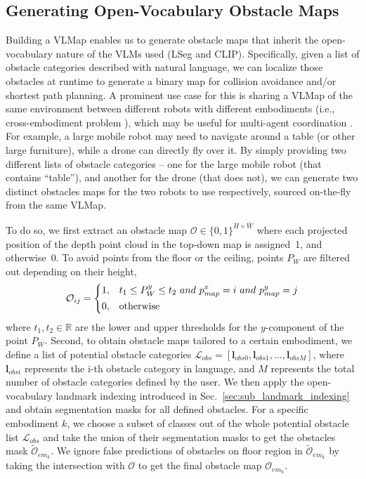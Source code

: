\documentclass[letterpaper, 10 pt, conference]{ieeeconf}  %
\newcommand{\ie}{i.e., }
\begin{document}
\subsection{Generating Open-Vocabulary Obstacle Maps}
\label{sec:obstacle_maps}
Building a VLMap enables us to generate obstacle maps that inherit the open-vocabulary nature of the VLMs used (LSeg and CLIP). Specifically, given a list of obstacle categories described with natural language, we can localize those obstacles at runtime to generate a binary map for collision avoidance and/or shortest path planning. A prominent use case for this is sharing a VLMap of the same environment between different robots with different embodiments (\ie cross-embodiment problem \cite{zakka2022xirl,ganapathi2022implicit}), which may be useful for multi-agent coordination \cite{wu2021spatial}. For example, a large mobile robot may need to navigate around a table (or other large furniture), while a drone can directly fly over it. By simply providing two different lists of obstacle categories -- one for the large mobile robot (that contains ``table''), and another for the drone (that does not), we can generate two distinct obstacles maps for the two robots to use respectively, sourced on-the-fly from the same VLMap.

To do so, we first extract an obstacle map $\mathcal{O} \in \{0, 1\}^{\bar{H} \times \bar{W}}$ where each projected position of the depth point cloud in the top-down map is assigned~1, and otherwise~0. To avoid points from the floor or the ceiling, points $P_{W}$ are filtered out depending on their height,
\begin{equation}
\mathcal{O}_{ij} = 
    \begin{dcases}
        1,& t_1 \leq P^{y}_{W} \leq t_2\ and\ p^{x}_{map} = i\ and\ p^{y}_{map} = j\\
        0,& \text{otherwise}
    \end{dcases}
\end{equation}
where $t_1, t_2 \in \mathbb{R}$ are the lower and upper thresholds for the $y$-component of the point $P_{W}$. 
Second, to obtain obstacle maps tailored to a certain embodiment, we define a list of potential obstacle categories $\mathcal{L}_{obs} = [\mathbf{l}_{obs0}, \mathbf{l}_{obs1}, \ldots, \mathbf{l}_{obsM}]$, where $\mathbf{l}_{obsi}$ represents the i-th obstacle category in language, and $M$ represents the total number of obstacle categories defined by the user. We then apply the open-vocabulary landmark indexing introduced in Sec.~\ref{sec:sub_landmark_indexing} and obtain segmentation masks for all defined obstacles. For a specific embodiment $k$, we choose a subset of classes out of the whole potential obstacle list $\mathcal{L}_{obs}$ and take the union of their segmentation masks to get the obstacles mask $\tilde{\mathcal{O}}_{em_k}$. We ignore false predictions of obstacles on floor region in $\tilde{\mathcal{O}}_{em_k}$ by taking the intersection with $\mathcal{O}$ to get the final obstacle map $\mathcal{O}_{em_k}$.
\end{document}
